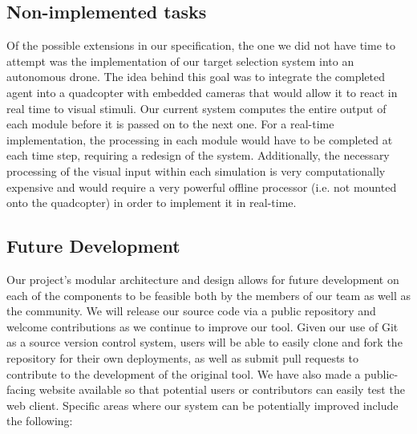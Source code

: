 \documentclass[a4paper,11pt]{article}
\begin{document}
\subsection{Non-implemented tasks}

Of the possible extensions in our specification, the one we did not have time to attempt was the implementation of our target selection system into an autonomous drone. The idea behind this goal was to integrate the completed agent into a quadcopter with embedded cameras that would allow it to react in real time to visual stimuli. Our current system computes the entire output of each module before it is passed on to the next one. For a real-time implementation, the processing in each module would have to be completed at each time step, requiring a redesign of the system. Additionally, the necessary processing of the visual input within each simulation is very computationally expensive and would require a very powerful offline processor (i.e. not mounted onto the quadcopter) in order to implement it in real-time. 

\subsection{Future Development}
Our project's modular architecture and design allows for future development on each of the components to be feasible both by the members of our team as well as the community. We will release our source code via a public repository and welcome contributions as we continue to improve our tool. Given our use of Git as a source version control system, users will be able to easily clone and fork the repository for their own deployments, as well as submit pull requests to contribute to the development of the original tool. We have also made a public-facing website available so that potential users or contributors can easily test the web client. Specific areas where our system can be potentially improved include the following:
\end{document}
